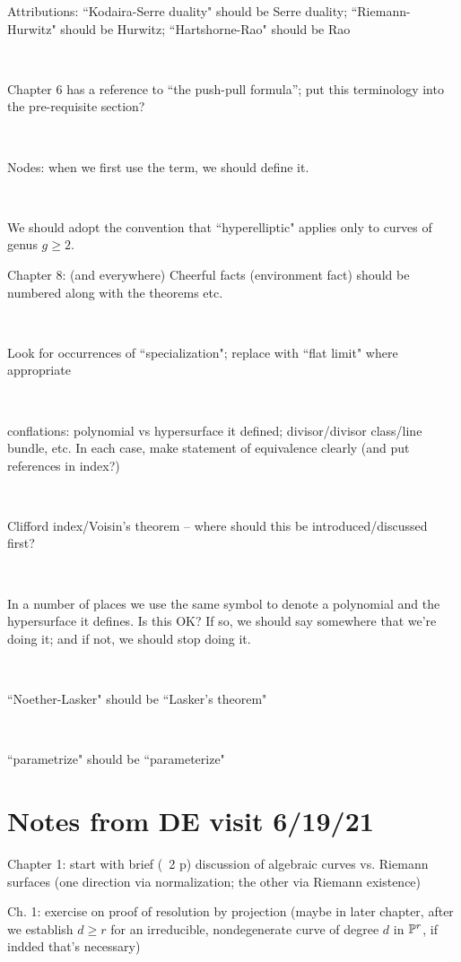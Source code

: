\documentclass[12pt, leqno]{book}
\begin{document}
Attributions: ``Kodaira-Serre duality" should be Serre duality; ``Riemann-Hurwitz" should be Hurwitz; ``Hartshorne-Rao" should be Rao

\ 

Chapter 6 has a reference to ``the push-pull formula''; put this terminology into the pre-requisite section?

\

Nodes: when we first use the term, we should define it.

\

We should adopt the convention that ``hyperelliptic" applies only to curves of genus $g \geq 2$.


Chapter 8: (and everywhere) Cheerful facts (environment fact) should be numbered along with the theorems etc.

\

Look for occurrences of ``specialization"; replace with ``flat limit" where appropriate

\

conflations: polynomial vs hypersurface it defined; divisor/divisor class/line bundle, etc. In each case, make statement of equivalence clearly (and put references in index?)

\

Clifford index/Voisin's theorem -- where should this be introduced/discussed first?

\

In a number of places we use the same symbol to denote a polynomial and the hypersurface it defines. Is this OK? If so, we should say somewhere that we're doing it; and if not, we should stop doing it.

\

``Noether-Lasker" should be ``Lasker's theorem"

\

``parametrize" should be ``parameterize"

\section{Notes from DE visit 6/19/21}

Chapter 1: start with brief (~2 p) discussion of algebraic curves vs. Riemann surfaces (one direction via normalization; the other via Riemann existence)

Ch. 1: exercise on proof of resolution by projection (maybe in later chapter, after we establish $d \geq r$ for an irreducible, nondegenerate  curve of degree $d$ in $\PP^r$, if indded that's necessary)
\end{document}
